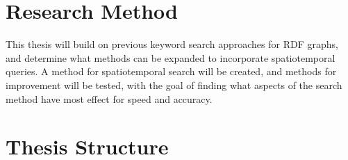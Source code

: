 \section{Research Method}
\label{sec:researchMethod}
This thesis will build on previous keyword search approaches for RDF graphs, and determine what methods can be expanded to incorporate spatiotemporal queries. A method for spatiotemporal search will be created, and methods for improvement will be tested, with the goal of finding what aspects of the search method have most effect for speed and accuracy.

\section{Thesis Structure}
\label{sec:thesisStructure}

\glsresetall